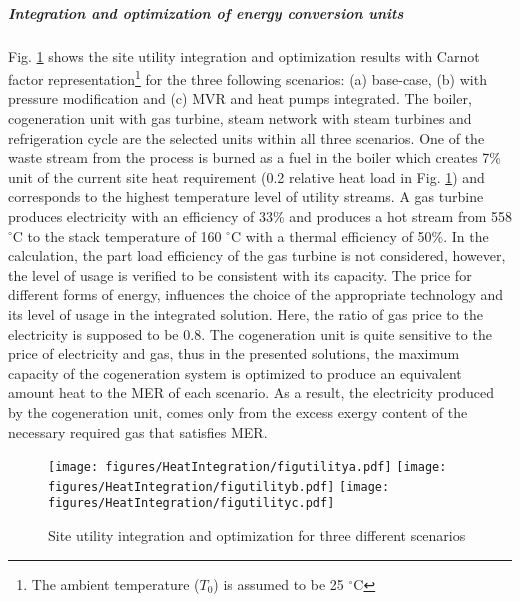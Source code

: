  \subparagraph{Integration and optimization of energy conversion units}

 Fig. \ref{fig3:VIIII} shows the site utility integration and optimization results with Carnot factor representation\footnote{The ambient temperature ($T_0$) is assumed to be 25 $^{\circ}\mathrm{C}$ } for the three following scenarios: (a) base-case, (b) with pressure modification and (c) MVR and heat pumps integrated. The boiler, cogeneration unit with gas turbine, steam network with steam turbines and refrigeration cycle are the selected units within all three scenarios. One of the waste stream from the process is burned as a fuel in the boiler which creates 7\% unit of the current site heat requirement (0.2 relative heat load in Fig. \ref{fig3:VIIII}) and corresponds to the highest temperature level of utility streams. A gas turbine produces electricity with an efficiency of 33\% and produces a hot stream from 558 $^{\circ}\mathrm{C}$ to the stack temperature of 160 $^{\circ}\mathrm{C}$ with a thermal efficiency of 50\%. In the calculation, the part load efficiency of the gas turbine is not considered, however, the level of usage is verified to be consistent with its capacity. The price for different forms of energy, influences the choice of the appropriate technology and its level of usage in the integrated solution. Here, the ratio of gas price to the electricity is supposed to be $0.8$. The cogeneration unit is quite sensitive to the price of electricity and gas, thus in the presented solutions, the maximum capacity of the cogeneration system is optimized to produce an equivalent amount heat to the MER of each scenario. As a result, the electricity produced by the cogeneration unit, comes only from the excess exergy content of the necessary required gas that satisfies MER. 
 
  \vspace{5mm}
 \begin{figure}[!ht]
 \begin{center}
 \texttt{[image: figures/HeatIntegration/figutilitya.pdf]}
 \texttt{[image: figures/HeatIntegration/figutilityb.pdf]}
 \texttt{[image: figures/HeatIntegration/figutilityc.pdf]}
 \caption{Site utility integration and optimization for three different scenarios}
 \label{fig3:VIIII}
 \end{center}
  \vspace{-5mm}
 \end{figure}
 

